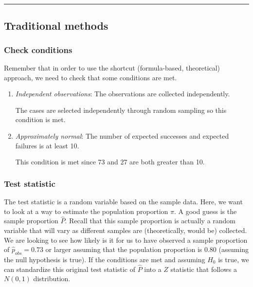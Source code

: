 \documentclass[]{tufte-book}
\let\oldrule=\rule
\renewcommand{\rule}[1]{\oldrule{\linewidth}}
\theoremstyle{definition}
\theoremstyle{definition}
\theoremstyle{remark}
\begin{document}
\begin{center}\rule{0.5\linewidth}{\linethickness}\end{center}

\subsection{Traditional methods}\label{traditional-methods-1}

\subsubsection{Check conditions}\label{check-conditions-1}

Remember that in order to use the shortcut (formula-based, theoretical)
approach, we need to check that some conditions are met.

\begin{enumerate}
\def\labelenumi{\arabic{enumi}.}
\item
  \emph{Independent observations}: The observations are collected
  independently.

  The cases are selected independently through random sampling so this
  condition is met.
\item
  \emph{Approximately normal}: The number of expected successes and
  expected failures is at least 10.

  This condition is met since 73 and 27 are both greater than 10.
\end{enumerate}

\subsubsection{Test statistic}\label{test-statistic-1}

The test statistic is a random variable based on the sample data. Here,
we want to look at a way to estimate the population proportion \(\pi\).
A good guess is the sample proportion \(\hat{P}\). Recall that this
sample proportion is actually a random variable that will vary as
different samples are (theoretically, would be) collected. We are
looking to see how likely is it for us to have observed a sample
proportion of \(\hat{p}_{obs} = 0.73\) or larger assuming that the
population proportion is 0.80 (assuming the null hypothesis is true). If
the conditions are met and assuming \(H_0\) is true, we can standardize
this original test statistic of \(\hat{P}\) into a \(Z\) statistic that
follows a \(N(0, 1)\) distribution.
\end{document}
